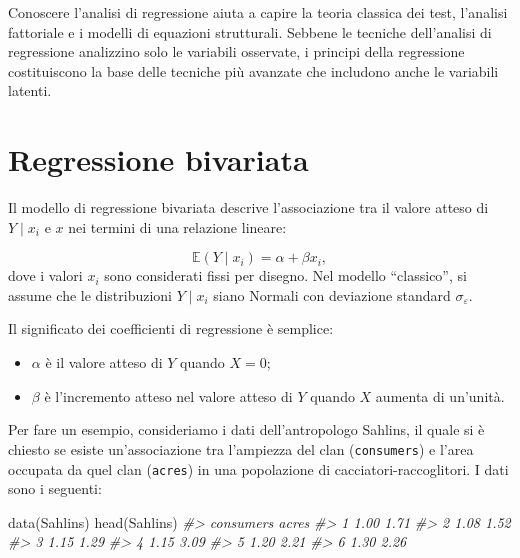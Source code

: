 \documentclass[
  11pt,
]{krantz}
\makeatletter
\newenvironment{Shaded}{\begin{snugshade}}{\end{snugshade}}
\newcommand{\CommentTok}[1]{\textcolor[rgb]{0.37,0.37,0.37}{\textit{#1}}}
\newcommand{\FunctionTok}[1]{\textcolor[rgb]{0,0,0}{#1}}
\newcommand{\NormalTok}[1]{#1}
\providecommand{\tightlist}{%
  \setlength{\itemsep}{0pt}\setlength{\parskip}{0pt}}
\newenvironment{kframe}{%
\medskip{}
\setlength{\fboxsep}{.8em}
 \def\at@end@of@kframe{}%
 \ifinner\ifhmode%
  \def\at@end@of@kframe{\end{minipage}}%
  \begin{minipage}{\columnwidth}%
 \fi\fi%
 \def\FrameCommand##1{\hskip\@totalleftmargin \hskip-\fboxsep
 \colorbox{shadecolor}{##1}\hskip-\fboxsep
     \hskip-\linewidth \hskip-\@totalleftmargin \hskip\columnwidth}%
 \MakeFramed {\advance\hsize-\width
   \@totalleftmargin\z@ \linewidth\hsize
   \@setminipage}}%
 {\par\unskip\endMakeFramed%
 \at@end@of@kframe}
\renewenvironment{Shaded}{\begin{kframe}}{\end{kframe}}
\makeatother
\begin{document}
Conoscere l'analisi di regressione aiuta a capire la teoria classica dei test, l'analisi fattoriale e i modelli di equazioni strutturali. Sebbene le tecniche dell'analisi di regressione analizzino solo le variabili osservate, i principi della regressione costituiscono la base delle tecniche più avanzate che includono anche le variabili latenti.

\hypertarget{regressione-bivariata}{%
\section{Regressione bivariata}\label{regressione-bivariata}}

Il modello di regressione bivariata descrive l'associazione tra il valore atteso di \(Y \mid x_i\) e \(x\) nei termini di una relazione lineare:

\[
\mathbb{E}(Y \mid x_i) = \alpha + \beta x_i,
\] dove i valori \(x_i\) sono considerati fissi per disegno. Nel modello ``classico'', si assume che le distribuzioni \(Y \mid x_i\) siano Normali con deviazione standard \(\sigma_\varepsilon\).

Il significato dei coefficienti di regressione è semplice:

\begin{itemize}
\tightlist
\item
  \(\alpha\) è il valore atteso di \(Y\) quando \(X = 0\);
\item
  \(\beta\) è l'incremento atteso nel valore atteso di \(Y\) quando \(X\) aumenta di un'unità.
\end{itemize}

Per fare un esempio, consideriamo i dati dell'antropologo Sahlins, il quale si è chiesto se esiste un'associazione tra l'ampiezza del clan (\texttt{consumers}) e l'area occupata da quel clan (\texttt{acres}) in una popolazione di cacciatori-raccoglitori. I dati sono i seguenti:

\begin{Shaded}
\begin{Highlighting}[]
\FunctionTok{data}\NormalTok{(Sahlins)}
\FunctionTok{head}\NormalTok{(Sahlins)}
\CommentTok{\#\textgreater{}   consumers acres}
\CommentTok{\#\textgreater{} 1      1.00  1.71}
\CommentTok{\#\textgreater{} 2      1.08  1.52}
\CommentTok{\#\textgreater{} 3      1.15  1.29}
\CommentTok{\#\textgreater{} 4      1.15  3.09}
\CommentTok{\#\textgreater{} 5      1.20  2.21}
\CommentTok{\#\textgreater{} 6      1.30  2.26}
\end{Highlighting}
\end{Shaded}
\end{document}
